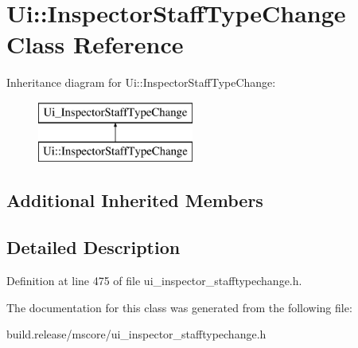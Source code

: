 \hypertarget{class_ui_1_1_inspector_staff_type_change}{}\section{Ui\+:\+:Inspector\+Staff\+Type\+Change Class Reference}
\label{class_ui_1_1_inspector_staff_type_change}
Inheritance diagram for Ui\+:\+:Inspector\+Staff\+Type\+Change\+:\begin{figure}[H]
\begin{center}
\leavevmode
\includegraphics[height=2.000000cm]{class_ui_1_1_inspector_staff_type_change}
\end{center}
\end{figure}
\subsection*{Additional Inherited Members}


\subsection{Detailed Description}


Definition at line 475 of file ui\+\_\+inspector\+\_\+stafftypechange.\+h.



The documentation for this class was generated from the following file\+:\begin{DoxyCompactItemize}
\item 
build.\+release/mscore/ui\+\_\+inspector\+\_\+stafftypechange.\+h\end{DoxyCompactItemize}

